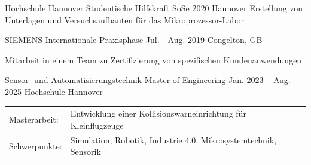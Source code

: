 \documentclass[12pt, a4paper]{awsome-cv-timeline}
\begin{document}
\begin{textblock*}
\begin{cventries}

		\end{cventries}
		\begin{cventries}
			\cventry%
				{Hochschule Hannover} %
				{Studentische Hilfskraft} %
				{SoSe 2020} %
				{Hannover} %
				{\vspace*{1.25ex}
					Erstellung von Unterlagen und Versuchsaufbauten für das Mikroprozessor-Labor
				}

			\cventry%
				{SIEMENS} %
				{Internationale Praxisphase} %
				{Jul. - Aug. 2019} %
				{Congelton, GB} %
				{\vspace*{1.25ex}
					Mitarbeit in einem Team zu Zertifizierung von spezifischen Kundenanwendungen
%
%
					\vspace{\baselineskip}
					\begin{cvitems}\item[]\end{cvitems}\vspace{-\baselineskip-2ex}
				}


		\end{cventries}

		\begin{cventries}
			\cventry%
				{Sensor- und Automatisierungstechnik}
				{Master of Engineering}
				{Jan. 2023 -- Aug. 2025}
				{Hochschule Hannover}
				{
					\begin{tabularx}{\textwidth}{@{}l@{\quad}X}
						Masterarbeit: & Entwicklung einer Kollisionswarneinrichtung für Kleinflugzeuge \\
						Schwerpunkte: &
							Simulation,
							Robotik,
							Industrie 4.0,
							Mikrosystemtechnik,
							Sensorik
					\end{tabularx}
					\vspace{-.5\baselineskip}
				}


\end{cventries}
\end{textblock*}
\end{document}

